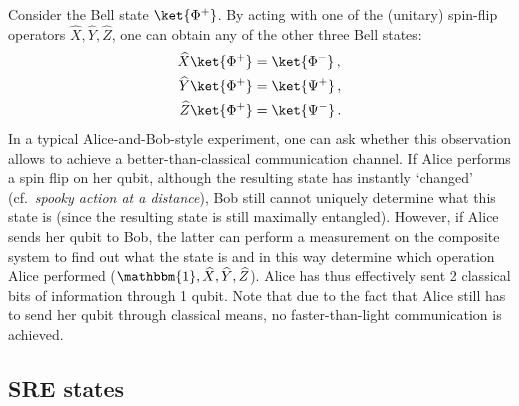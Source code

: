     \begin{method}
        Consider the Bell state $\ket{\Phi^+}$. By acting with one of the (unitary) spin-flip operators $\widehat{X},\widehat{Y},\widehat{Z}$, one can obtain any of the other three Bell states:
        \begin{gather}
            \begin{aligned}
                \widehat{X}\ket{\Phi^+} &= \ket{\Phi^-}\,,\\
                \widehat{Y}\ket{\Phi^+} &= \ket{\Psi^+}\,,\\
                \widehat{Z}\ket{\Phi^+} &= \ket{\Psi^-}\,.
            \end{aligned}
        \end{gather}
        In a typical Alice-and-Bob-style experiment, one can ask whether this observation allows to achieve a better-than-classical communication channel. If Alice performs a spin flip on her qubit, although the resulting state has instantly `changed' (cf.~\textit{spooky action at a distance}), Bob still cannot uniquely determine what this state is (since the resulting state is still maximally entangled). However, if Alice sends her qubit to Bob, the latter can perform a measurement on the composite system to find out what the state is and in this way determine which operation Alice performed ($\mathbbm{1},\widehat{X},\widehat{Y},\widehat{Z}$). Alice has thus effectively sent 2 classical bits of information through 1 qubit. Note that due to the fact that Alice still has to send her qubit through classical means, no faster-than-light communication is achieved.
    \end{method}


\subsection{SRE states}\label{section:sre_states}

